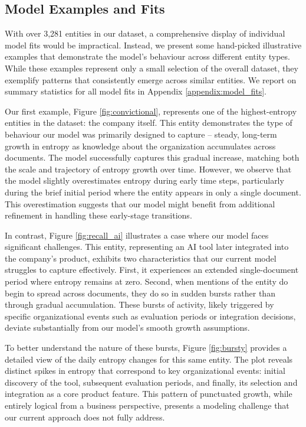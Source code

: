 \documentclass[11pt,a4paper]{article}
\begin{document}
\subsection{Model Examples and Fits}
\label{subsec:model_examples}

With over 3,281 entities in our dataset, a comprehensive display of individual model fits would be impractical. Instead, we present some hand-picked illustrative examples that demonstrate the model's behaviour across different entity types. While these examples represent only a small selection of the overall dataset, they exemplify patterns that consistently emerge across similar entities. We report on summary statistics for all model fits in Appendix \ref{appendix:model_fits}.

Our first example, Figure \ref{fig:convictional}, represents one of the highest-entropy entities in the dataset: the company itself. This entity demonstrates the type of behaviour our model was primarily designed to capture -- steady, long-term growth in entropy as knowledge about the organization accumulates across documents. The model successfully captures this gradual increase, matching both the scale and trajectory of entropy growth over time. However, we observe that the model slightly overestimates entropy during early time steps, particularly during the brief initial period where the entity appears in only a single document. This overestimation suggests that our model might benefit from additional refinement in handling these early-stage transitions.

In contrast, Figure \ref{fig:recall_ai} illustrates a case where our model faces significant challenges. This entity, representing an AI tool later integrated into the company's product, exhibits two characteristics that our current model struggles to capture effectively. First, it experiences an extended single-document period where entropy remains at zero. Second, when mentions of the entity do begin to spread across documents, they do so in sudden bursts rather than through gradual accumulation. These bursts of activity, likely triggered by specific organizational events such as evaluation periods or integration decisions, deviate substantially from our model's smooth growth assumptions.

To better understand the nature of these bursts, Figure \ref{fig:bursty} provides a detailed view of the daily entropy changes for this same entity. The plot reveals distinct spikes in entropy that correspond to key organizational events: initial discovery of the tool, subsequent evaluation periods, and finally, its selection and integration as a core product feature. This pattern of punctuated growth, while entirely logical from a business perspective, presents a modeling challenge that our current approach does not fully address.
\end{document}
